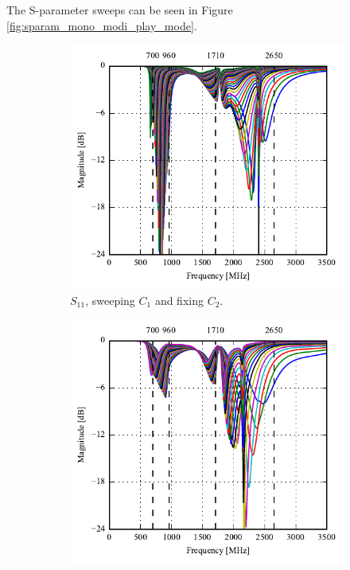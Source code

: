 The S-parameter sweeps can be seen in Figure \ref{fig:sparam_mono_modi_play_mode}.

  \begin{figure}[htbp]
    \begin{subfigure}[b]{0.49\linewidth}
      \centering
      \includegraphics{img/tech_sol/monopole/highband/ue/playmode/s11.pdf}
      \caption{$S_{11}$, sweeping $C_1$ and fixing $C_2$.}
    \end{subfigure}
    \hfill
    \begin{subfigure}[b]{0.49\linewidth}
        \centering
        \includegraphics{img/tech_sol/monopole/highband/ue/playmode/s22.pdf}

\end{subfigure}
\end{figure}
